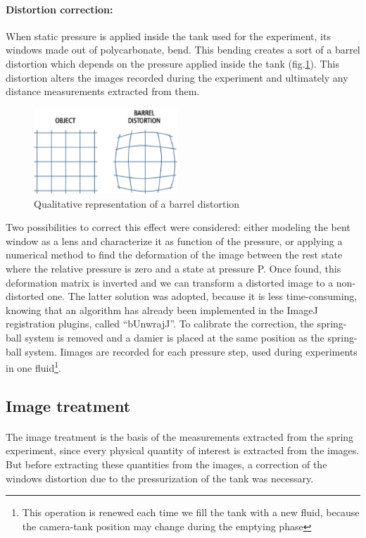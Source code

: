 \paragraph{Distortion correction:}
When static pressure is applied inside the tank used for the experiment, its windows made out of polycarbonate, bend. This bending creates a sort of a barrel distortion which depends on the pressure applied inside the tank (fig.\ref{fig:barrel_distortion}). This distortion alters the images recorded during the experiment and ultimately any distance measurements extracted from them.
\begin{figure}[H] %
	\centering%
  \includegraphics[width=0.48\textwidth]{figures/Chapter_1/barrel_effect.png}
	\caption{Qualitative representation of a barrel distortion}
	\label{fig:barrel_distortion}
\end{figure}
 Two possibilities to correct this effect were considered: either modeling the bent window as a lens and characterize it as function of the pressure, or applying a numerical method to find the deformation of the image between the rest state where the relative pressure is zero and a state at pressure P. Once found, this deformation matrix is inverted and we can transform a distorted image to a non-distorted one. The latter solution was adopted, because it is less time-consuming, knowing that an algorithm has already been implemented in the ImageJ registration plugins, called "`bUnwrajJ"'.
To calibrate the correction, the spring-ball system is removed and a damier is placed at the same position as the spring-ball system. Iimages are recorded for each pressure step, used during experiments in one fluid\footnote{This operation is renewed each time we fill the tank with a new fluid, because the camera-tank position may change during the emptying phase}.




\subsection{Image treatment}
\paragraph{}
 The image treatment is the basis of the measurements extracted from the spring experiment, since every physical quantity of interest is extracted from the images. But before extracting these quantities from the images, a correction of the windows distortion due to the pressurization of the tank was necessary.
